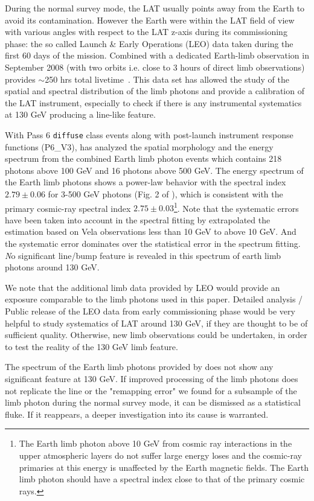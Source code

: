 \documentclass[aps,twocolumn,prd,superscriptaddress,showpacs,nofootinbib,fixfloat]{revtex4}
\begin{document}
During the normal survey mode, the LAT usually points away
from the Earth to avoid its contamination. However the Earth
were within the LAT field of view with various angles with
respect to the LAT z-axis during its commissioning phase:
the so called Launch \& Early Operations (LEO) data taken during the first 60 days of the mission. Combined with
a dedicated Earth-limb observation in September 2008 (with
two orbits i.e. close to 3 hours of direct limb
observations) provides $\sim$250 hrs total livetime~\cite{FermiLimb}. This data set has allowed the study of
the spatial and spectral distribution of the limb photons
and provide a calibration of the LAT instrument, especially
to check if there is any instrumental systematics at 130 GeV
producing a line-like feature.

With Pass 6 \texttt{diffuse} class events along with post-launch
instrument response functions (P6\_V3), \cite{FermiLimb} has
analyzed the spatial morphology and the energy spectrum from
the combined Earth limb photon events which contains 218
photons above 100 GeV and 16 photons above 500 GeV. The
energy spectrum of the Earth limb photons shows a power-law
behavior with the spectral index $2.79\pm 0.06$ for 3-500
GeV photons (Fig. 2 of \cite{FermiLimb}), which is
consistent with the primary cosmic-ray spectral index
$2.75\pm 0.03$\footnote{The Earth limb photon above 10 GeV
  from cosmic ray interactions in the upper atmospheric
  layers do not suffer large energy loses and the cosmic-ray
  primaries at this energy is unaffected by the Earth
  magnetic fields. The Earth limb photon should have a
  spectral index close to that of the primary cosmic
  rays. }. Note that the systematic errors have been taken into
account in the spectral fitting by extrapolated the estimation based on Vela
observations less than 10 GeV to above 10 GeV. And the
systematic error dominates over the statistical error in the
spectrum fitting. {\emph No significant line/bump feature is revealed in this spectrum of earth limb photons around 130 GeV.}


We note that the additional limb data provided by LEO would
provide an exposure comparable to the limb photons used
in this paper. Detailed analysis / Public release of the LEO data
from early commissioning phase would be very helpful to study systematics of LAT around 130 GeV, if they are thought to be of
sufficient quality.  Otherwise, new limb observations could
be undertaken, in order to test the reality of the 130 GeV
limb feature.

The spectrum of the Earth limb photons provided by
\citep{FermiLimb} does not show any significant feature at
130 GeV. If improved processing of the limb photons does not replicate the line
or the "remapping error" we found for a subsample of the
limb photon during the normal survey mode, it can be
dismissed as a statistical fluke.  If it reappears, a deeper
investigation into its cause is warranted.
\end{document}
